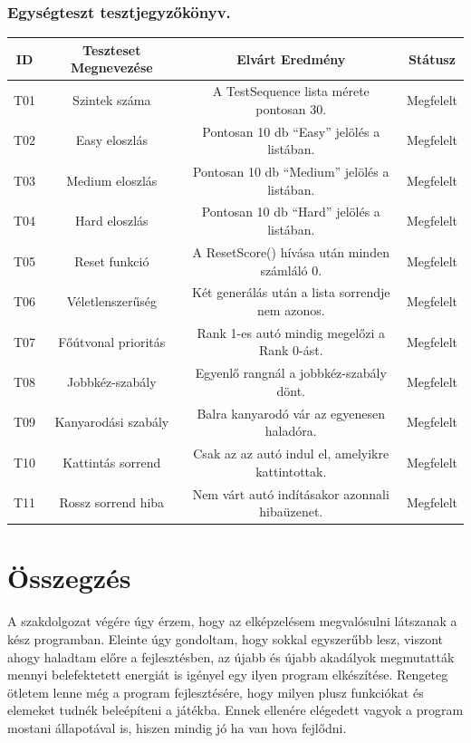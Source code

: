 \documentclass[
]{thesis-ekf}
\theoremstyle{definition}
\theoremstyle{remark}
\begin{document}
\subsection{Egységteszt tesztjegyzőkönyv.}

\begin{tabular}{|c|c|c|c|}
	\hline
	ID & Teszteset Megnevezése & Elvárt Eredmény & Státusz \\
	\hline
	T01 & Szintek száma & A TestSequence lista mérete pontosan 30. & Megfelelt\\
	\hline
	T02 & Easy eloszlás & Pontosan 10 db ``Easy'' jelölés a listában. & Megfelelt\\
	\hline
	T03 & Medium eloszlás & Pontosan 10 db ``Medium'' jelölés a listában. & Megfelelt\\
	\hline
	T04 & Hard eloszlás & Pontosan 10 db ``Hard'' jelölés a listában. & Megfelelt\\
	\hline
	T05 & Reset funkció & A ResetScore() hívása után minden számláló 0. & Megfelelt\\
	\hline
	T06 & Véletlenszerűség & Két generálás után a lista sorrendje nem azonos. & Megfelelt\\
	\hline
	T07 & Főútvonal prioritás & Rank 1-es autó mindig megelőzi a Rank 0-ást. & Megfelelt\\
	\hline
	T08 & Jobbkéz-szabály & Egyenlő rangnál a jobbkéz-szabály dönt. & Megfelelt\\
	\hline
	T09 & Kanyarodási szabály & Balra kanyarodó vár az egyenesen haladóra. & Megfelelt\\
	\hline
	T10 & Kattintás sorrend & Csak az az autó indul el, amelyikre kattintottak. & Megfelelt\\
	\hline
	T11 & Rossz sorrend hiba & Nem várt autó indításakor azonnali hibaüzenet. & Megfelelt\\
	\hline
\end{tabular}
\chapter*{Összegzés}
A szakdolgozat végére úgy érzem, hogy az elképzelésem megvalósulni látszanak a kész programban. Eleinte úgy gondoltam, hogy sokkal egyszerűbb lesz, viszont ahogy haladtam előre a fejlesztésben, az újabb és újabb akadályok megmutatták mennyi belefektetett energiát is igényel egy ilyen program elkészítése. Rengeteg ötletem lenne még a program fejlesztésére, hogy milyen plusz funkciókat és elemeket tudnék beleépíteni a játékba. Ennek ellenére elégedett vagyok a program mostani állapotával is, hiszen mindig jó ha van hova fejlődni.
\end{document}
